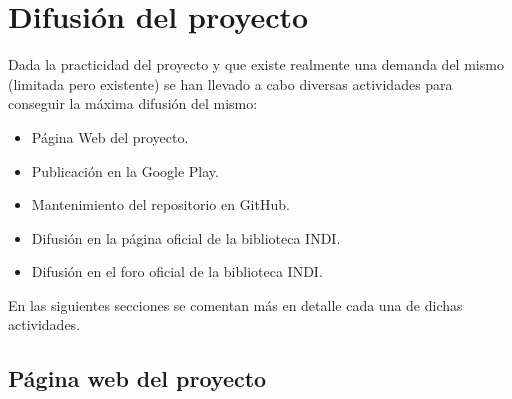 \chapter{Difusión del proyecto}

Dada la practicidad del proyecto y que existe realmente una demanda del mismo (limitada pero existente) se han llevado a cabo diversas actividades para conseguir la máxima difusión del mismo:

\begin{itemize}
  \item Página Web del proyecto.
  
  \item Publicación en la Google Play.
  
  \item Mantenimiento del repositorio en GitHub.
  
  \item Difusión en la página oficial de la biblioteca INDI.
  
  \item Difusión en el foro oficial de la biblioteca INDI.
\end{itemize}

En las siguientes secciones se comentan más en detalle cada una de dichas actividades.

\section{Página web del proyecto}

